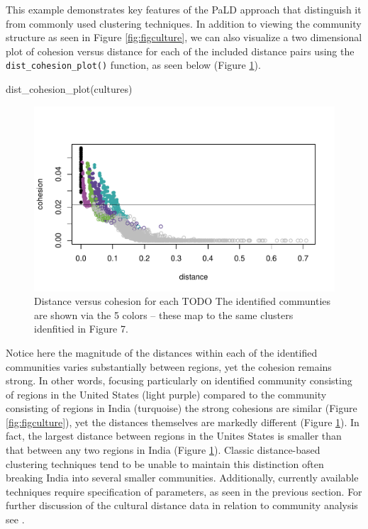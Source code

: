 This example demonstrates key features of the PaLD approach that
distinguish it from commonly used clustering techniques. In addition to
viewing the community structure as seen in Figure \ref{fig:figculture},
we can also visualize a two dimensional plot of cohesion versus distance
for each of the included distance pairs using the
\texttt{dist\_cohesion\_plot()} function, as seen below (Figure
\ref{fig:figco}).

\begin{Schunk}
\begin{Sinput}
dist_cohesion_plot(cultures)
\end{Sinput}
\begin{figure}
\includegraphics{dagostino-mcgowan_files/figure-latex/figco-1} \caption[Distance versus cohesion for each TODO The identified communties are shown via the 5 colors -- these map to the same clusters idenfitied in Figure 7]{Distance versus cohesion for each TODO The identified communties are shown via the 5 colors -- these map to the same clusters idenfitied in Figure 7.}\label{fig:figco}
\end{figure}
\end{Schunk}

Notice here the magnitude of the distances within each of the identified
communities varies substantially between regions, yet the cohesion
remains strong. In other words, focusing particularly on identified
community consisting of regions in the United States (light purple)
compared to the community consisting of regions in India (turquoise) the
strong cohesions are similar (Figure \ref{fig:figculture}), yet the
distances themselves are markedly different (Figure \ref{fig:figco}). In
fact, the largest distance between regions in the Unites States is
smaller than that between any two regions in India (Figure
\ref{fig:figco}). Classic distance-based clustering techniques tend to
be unable to maintain this distinction often breaking India into several
smaller communities. Additionally, currently available techniques
require specification of parameters, as seen in the previous section.
For further discussion of the cultural distance data in relation to
community analysis see \citet{berenhaut2022social}.

